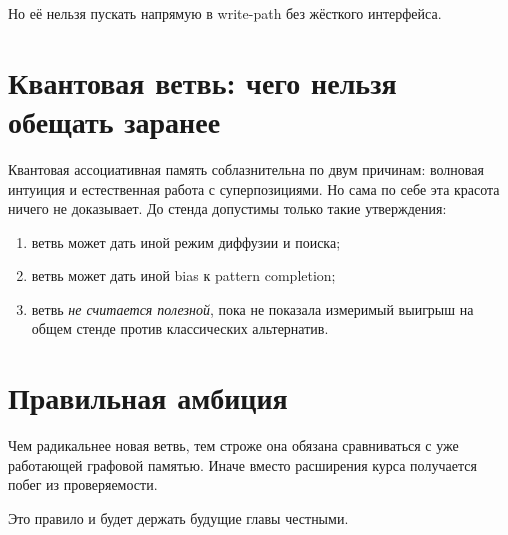 Но её нельзя пускать напрямую в write-path без жёсткого интерфейса.

\section{Квантовая ветвь: чего нельзя обещать заранее}

Квантовая ассоциативная память соблазнительна по двум причинам: волновая интуиция
и естественная работа с суперпозициями. Но сама по себе эта красота ничего не
доказывает. До стенда допустимы только такие утверждения:
\begin{enumerate}
\item ветвь может дать иной режим диффузии и поиска;
\item ветвь может дать иной bias к pattern completion;
\item ветвь \emph{не считается полезной}, пока не показала измеримый выигрыш на
общем стенде против классических альтернатив.
\end{enumerate}

\section{Правильная амбиция}

\begin{principle}
Чем радикальнее новая ветвь, тем строже она обязана сравниваться с уже работающей
графовой памятью. Иначе вместо расширения курса получается побег из проверяемости.
\end{principle}

Это правило и будет держать будущие главы честными.
